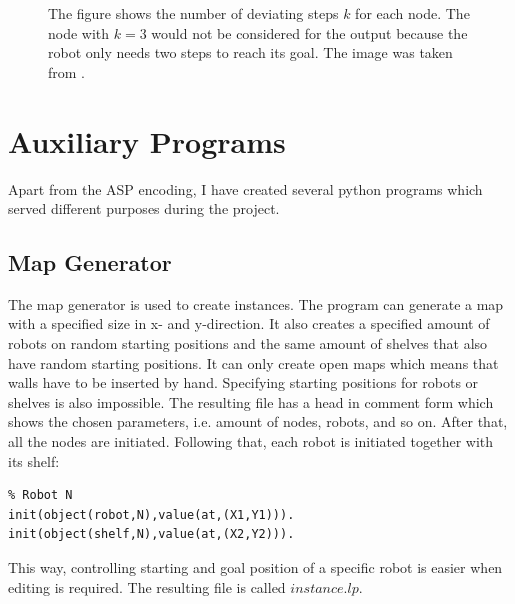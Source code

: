 \documentclass[runningheads]{llncs}
\begin{document}
\begin{figure}[h]
\caption{The figure shows the number of deviating steps $k$ for each node. The node with $k=3$ would not be considered for the output because the robot only needs two steps to reach its goal. The image was taken from \cite{rn}.}
\label{fig:rn}
\end{figure}

\section{Auxiliary Programs}
Apart from the ASP encoding, I have created several python programs which served different purposes during the project.
\subsection{Map Generator}
The map generator is used to create instances. The program can generate a map with a specified size in x- and y-direction. It also creates a specified amount of robots on random starting positions and the same amount of shelves that also have random starting positions. It can only create open maps which means that walls have to be inserted by hand. Specifying starting positions for robots or shelves is also impossible. The resulting file has a head in comment form which shows the chosen parameters, i.e. amount of nodes, robots, and so on. After that, all the nodes are initiated. Following that, each robot is initiated together with its shelf:
\begin{verbatim}
% Robot N
init(object(robot,N),value(at,(X1,Y1))).
init(object(shelf,N),value(at,(X2,Y2))).
\end{verbatim}
This way, controlling starting and goal position of a specific robot is easier when editing is required. The resulting file is called $instance.lp$.
\end{document}

